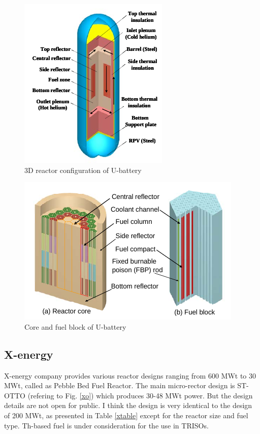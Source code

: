 \documentclass[10pt,a4paper]{article}
\begin{document}
\begin{figure}[htbp]
\centering
\includegraphics[scale=1]{Figs/ubattery3d.jpeg}
\caption{ 3D reactor configuration of U-battery}
\label{u3d}
\end{figure}

\begin{figure}[htbp]
\centering
\includegraphics[scale=1]{Figs/ubatterycore.jpeg}
\caption{ Core and fuel block of U-battery}
\label{ucore}
\end{figure}

\subsection{X-energy}
X-energy company provides various reactor designs ranging from 600 MWt to 30 MWt, called as Pebble Bed Fuel Reactor. The main micro-rector design is ST-OTTO (refering to Fig.  \ref{xo}) which produces 30-48 MWt power. But the design details are not open for public. I think the design is very identical to the design of 200 MWt, as presented in Table \ref{xtable} except for the reactor size and fuel type. Th-based fuel is under consideration for the use in TRISOs. 
\end{document}
